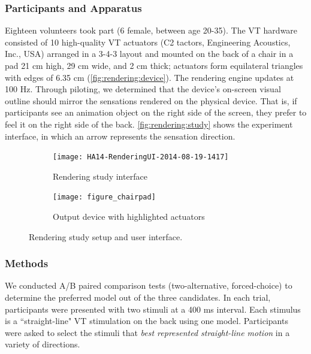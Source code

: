 \subsubsection{Participants and Apparatus}
Eighteen volunteers took part (6 female, between age 20-35). %
%
The VT hardware consisted of 10 high-quality VT actuators (C2 tactors, Engineering Acoustics, Inc., USA) arranged in a 3-4-3 layout and mounted on the back of a chair in a pad  21 cm high, 29 cm wide, and 2 cm thick;  actuators form equilateral triangles with edges of 6.35 cm  (\autoref{fig:rendering:device}). The rendering engine updates at 100 Hz.
Through piloting, we determined that the device's on-screen visual outline should mirror the sensations rendered on the physical device. That is, if participants see an animation object on the right side of the screen, they prefer to feel it on the right side of the back. 
\autoref{fig:rendering:study} shows the experiment interface, in which an arrow represents the sensation direction. 


\begin{figure}[t] %
   \centering
   \begin{subfigure}[b]{0.37\textwidth}
	   \texttt{[image: HA14-RenderingUI-2014-08-19-1417]} 
	   \caption{Rendering study interface}
	   \label{fig:rendering:study}
    \end{subfigure}
    \qquad
     \begin{subfigure}[b]{0.55\textwidth}
	   	\texttt{[image: figure\_chairpad]} 
	   \caption{Output device with highlighted actuators}
	   \label{fig:rendering:device}
    \end{subfigure}
    	   \caption{Rendering study setup and user interface.}
	   \label{fig:rendering}
\end{figure}

\subsubsection{Methods}
We conducted %
A/B paired comparison tests (two-alternative, forced-choice) to determine the preferred model out of the three candidates.
%
In each trial, participants were presented with two stimuli at %
a 400 ms interval.
Each stimulus is
a ``straight-line" VT stimulation on the back using one model. %
Participants were asked to %
select the stimuli that \emph{best represented straight-line motion} in a variety of directions.

